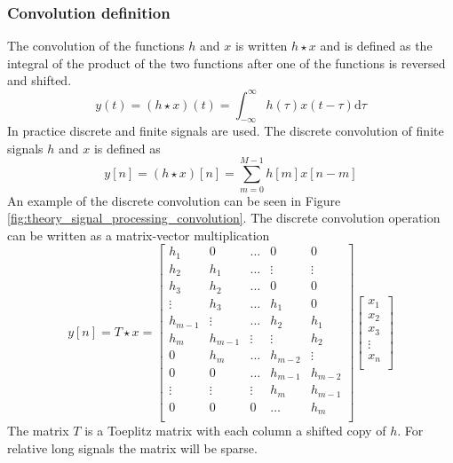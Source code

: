 \subsubsection{Convolution definition}
The convolution of the functions $h$ and $x$ is written $h \star x$ and is defined as the integral of the product of the two functions after one of the functions is reversed and shifted.
\begin{equation}
 y(t) = (h \star x)(t) = \int_{-\infty}^{\infty} h(\tau)x(t-\tau) \mathrm{d}\tau
\end{equation}
In practice discrete and finite signals are used. The discrete convolution of finite signals $h$ and $x$ is defined as
\begin{equation}\label{eq:theory_signal_processing_convolution_fir}
 y [n] = (h \star x )[n] = \sum_{m=0}^{M-1} h[m] x[n-m]
\end{equation}
An example of the discrete convolution can be seen in Figure \ref{fig:theory_signal_processing_convolution}.
The discrete convolution operation can be written as a matrix-vector multiplication
\begin{equation}\label{eq:theory_signal_processing_convolution_toeplitz}
 y [n] = T \star x =
 \begin{bmatrix}
 h_1 & 0 & \hdots & 0 & 0 \\
 h_2 & h_1 & \hdots & \vdots & \vdots \\
 h_3 & h_2 & \hdots & 0 & 0 \\
 \vdots & h_3 & \hdots & h_1 & 0 \\
 h_{m-1} & \vdots & \hdots & h_2 & h_1 \\
 h_m & h_{m-1} & \vdots & \vdots & h_2 \\
 0 & h_m & \hdots & h_{m-2} & \vdots \\
 0 & 0 & \hdots & h_{m-1} & h_{m-2} \\
 \vdots & \vdots & \vdots & h_{m} & h_{m-1} \\
 0 & 0 & 0 & \hdots & h_{m} \\
 \end{bmatrix}
 \begin{bmatrix}
  x_1 \\
  x_2 \\
  x_3 \\
  \vdots \\
  x_n \\
 \end{bmatrix}
\end{equation}
The matrix $T$ is a Toeplitz matrix with each column a shifted copy of $h$.
For relative long signals the matrix will be sparse.

